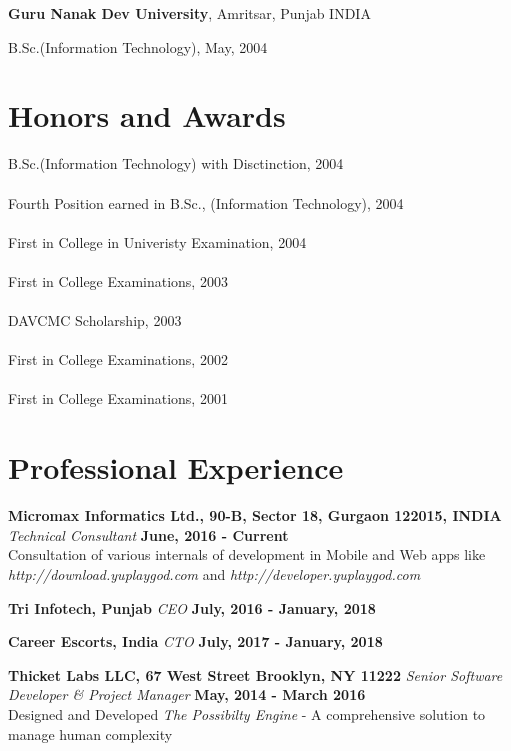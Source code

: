 \documentclass[margin,line]{res}
\newenvironment{list1}{
  \begin{list}{\ding{113}}{%
      \setlength{\itemsep}{0in}
      \setlength{\parsep}{0in} \setlength{\parskip}{0in}
      \setlength{\topsep}{0in} \setlength{\partopsep}{0in}
      \setlength{\leftmargin}{0.17in}}}{\end{list}}
\begin{document}
\begin{resume}
{\bf Guru Nanak Dev University}, Amritsar, Punjab INDIA\\
\vspace*{-.1in}
\begin{list1}
\item[] B.Sc.(Information Technology),  May, 2004
\end{list1}

\section{\sc Honors and Awards}
B.Sc.(Information Technology) with Disctinction, 2004\\\\
Fourth Position earned in B.Sc., (Information Technology), 2004\\\\
First in College in Univeristy Examination, 2004\\\\
First in College Examinations, 2003\\\\
DAVCMC Scholarship, 2003\\\\
First in College Examinations, 2002\\\\
First in College Examinations, 2001\\

\section{\sc Professional Experience}

%
%

{\bf Micromax Informatics Ltd., 90-B, Sector 18, Gurgaon 122015, INDIA}
{\em Technical Consultant} \hfill {\bf June, 2016 - Current}\\
Consultation of various internals of development in Mobile and Web apps like {\em http://download.yuplaygod.com} and {\em http://developer.yuplaygod.com}

{\bf Tri Infotech, Punjab}
{\em CEO} \hfill {\bf July, 2016 - January, 2018}

{\bf Career Escorts, India}
{\em CTO} \hfill {\bf July, 2017 - January, 2018}

{\bf Thicket Labs LLC, 67 West Street Brooklyn, NY 11222}
{\em Senior Software Developer \& Project Manager} \hfill {\bf May, 2014 - March 2016}\\
Designed and Developed {\em The Possibilty Engine} - A comprehensive solution to manage human complexity


\end{resume}
\end{document}
